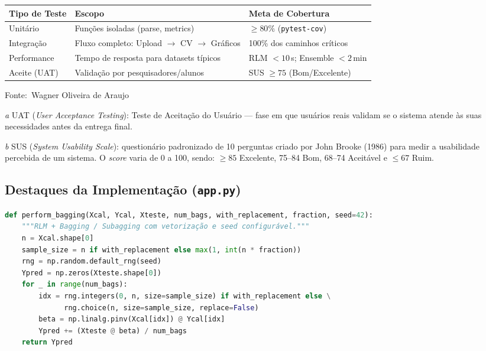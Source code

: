 \documentclass[12pt,a4paper]{article}
\newcommand{\oautor}{Wagner Oliveira de Araujo}
\begin{document}
\begin{quadro}[ht]
\centering
\small
\caption{Estratégia de testes e critérios de aceite}
\label{quadro:testes}
\begin{threeparttable}
\begin{tabularx}{\textwidth}{|l|X|X|} \hline
\textbf{Tipo de Teste} & \textbf{Escopo} & \textbf{Meta de Cobertura} \\ \hline
Unitário & Funções isoladas (parse, metrics) & $\ge 80\%$ (\texttt{pytest-cov}) \\ \hline
Integração & Fluxo completo: Upload $\rightarrow$ CV $\rightarrow$ Gráficos & 100\% dos caminhos críticos \\ \hline
Performance & Tempo de resposta para datasets típicos & RLM $< 10\,$s; Ensemble $< 2\,$min \\ \hline
Aceite (UAT)\tnote{a} & Validação por pesquisadores/alunos & SUS\tnote{b} $\ge 75$ (Bom/Excelente) \\ \hline
\end{tabularx}
\begin{tablenotes}[flushleft]
\footnotesize
\item Fonte:~\oautor
\item[\textit{a}] UAT (\textit{User Acceptance Testing}): Teste de Aceitação do Usuário --- fase em que usuários reais validam se o sistema atende às suas necessidades antes da entrega final.
\item[\textit{b}] SUS (\textit{System Usability Scale}): questionário padronizado de 10 perguntas criado por John Brooke (1986) para medir a usabilidade percebida de um sistema. O \textit{score} varia de 0 a 100, sendo: $\ge 85$ Excelente, 75--84 Bom, 68--74 Aceitável e $\le 67$ Ruim.
\end{tablenotes}
\end{threeparttable}
\end{quadro}

\subsection{Destaques da Implementação (\texttt{app.py})}
\begin{lstlisting}[language=Python]
def perform_bagging(Xcal, Ycal, Xteste, num_bags, with_replacement, fraction, seed=42):
    """RLM + Bagging / Subagging com vetorização e seed configurável."""
    n = Xcal.shape[0]
    sample_size = n if with_replacement else max(1, int(n * fraction))
    rng = np.random.default_rng(seed)
    Ypred = np.zeros(Xteste.shape[0])
    for _ in range(num_bags):
        idx = rng.integers(0, n, size=sample_size) if with_replacement else \
              rng.choice(n, size=sample_size, replace=False)
        beta = np.linalg.pinv(Xcal[idx]) @ Ycal[idx]
        Ypred += (Xteste @ beta) / num_bags
    return Ypred
\end{lstlisting}
\end{document}
